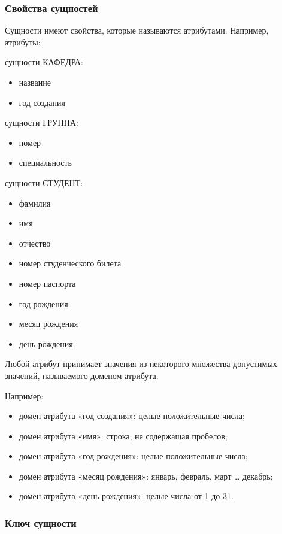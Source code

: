 \documentclass[a4paper]{article}
\begin{document}
\subsubsection{Свойства сущностей}
Сущности имеют свойства, которые называются атрибутами.
Например, атрибуты:

сущности КАФЕДРА:
    \begin{itemize}
      \item название
      \item год создания
    \end{itemize}

сущности ГРУППА:
\begin{itemize}
    \item номер
    \item специальность
\end{itemize}

сущности СТУДЕНТ:
\begin{itemize}
\item фамилия
\item имя
\item отчество
\item номер студенческого билета
\item номер паспорта
\item год рождения
\item месяц рождения
\item день рождения
\end{itemize}

Любой атрибут принимает значения из некоторого множества допустимых значений, называемого доменом атрибута.

Например:
\begin{itemize}
    \item домен атрибута «год создания»: целые положительные числа;
    \item домен атрибута «имя»: строка, не содержащая пробелов;
    \item домен атрибута «год рождения»: целые положительные числа;
    \item домен атрибута «месяц рождения»: январь, февраль, март … декабрь;
    \item домен атрибута «день рождения»: целые числа от 1 до 31.
\end{itemize}

\subsubsection{Ключ сущности}
\end{document}
